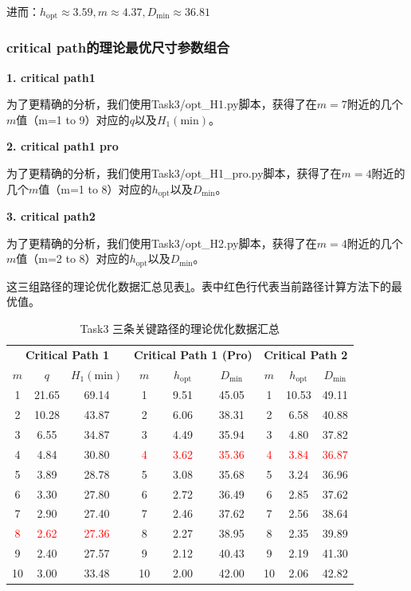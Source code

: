 \documentclass[UTF8,12pt,a4paper]{ctexart}
\begin{document}
进而：$h_{\text{opt}} \approx 3.59, m \approx 4.37, D_{\text{min}} \approx 36.81$


\subsubsection{critical path的理论最优尺寸参数组合}

\textbf{1. critical path1}

为了更精确的分析，我们使用Task3/opt\_H1.py脚本，获得了在$m=7$附近的几个$m$值（m=1 to 9）对应的$q$以及$H_1(\text{min})$。

\textbf{2. critical path1 pro}

为了更精确的分析，我们使用Task3/opt\_H1\_pro.py脚本，获得了在$m=4$附近的几个$m$值（m=1 to 8）对应的$h_{\text{opt}}$以及$D_{\text{min}}$。

\textbf{3. critical path2}

为了更精确的分析，我们使用Task3/opt\_H2.py脚本，获得了在$m=4$附近的几个$m$值（m=2 to 8）对应的$h_{\text{opt}}$以及$D_{\text{min}}$。

这三组路径的理论优化数据汇总见表\ref{tab:task3_theo_opt_all}。表中红色行代表当前路径计算方法下的最优值。

\begin{table}[htbp]
    \centering
    \caption{Task3 三条关键路径的理论优化数据汇总}
    \label{tab:task3_theo_opt_all}
    \small
    \begin{tabular}{ccc|ccc|ccc}
    \toprule
    \multicolumn{3}{c|}{\textbf{Critical Path 1}} & \multicolumn{3}{c|}{\textbf{Critical Path 1 (Pro)}} & \multicolumn{3}{c}{\textbf{Critical Path 2}} \\
    $m$ & $q$ & $H_{1}(\text{min})$ & $m$ & $h_{\text{opt}}$ & $D_{\text{min}}$ & $m$ & $h_{\text{opt}}$ & $D_{\text{min}}$ \\
    \midrule
    1 & 21.65 & 69.14 & 1 & 9.51 & 45.05 & 1 & 10.53 & 49.11 \\
    2 & 10.28 & 43.87 & 2 & 6.06 & 38.31 & 2 & 6.58 & 40.88 \\
    3 & 6.55 & 34.87 & 3 & 4.49 & 35.94 & 3 & 4.80 & 37.82 \\
    4 & 4.84 & 30.80 & \textcolor{red}{4} & \textcolor{red}{3.62} & \textcolor{red}{35.36} & \textcolor{red}{4} & \textcolor{red}{3.84} & \textcolor{red}{36.87} \\
    5 & 3.89 & 28.78 & 5 & 3.08 & 35.68 & 5 & 3.24 & 36.96 \\
    6 & 3.30 & 27.80 & 6 & 2.72 & 36.49 & 6 & 2.85 & 37.62 \\
    7 & 2.90 & 27.40 & 7 & 2.46 & 37.62 & 7 & 2.56 & 38.64 \\
    \textcolor{red}{8} & \textcolor{red}{2.62} & \textcolor{red}{27.36} & 8 & 2.27 & 38.95 & 8 & 2.35 & 39.89 \\
    9 & 2.40 & 27.57 & 9 & 2.12 & 40.43 & 9 & 2.19 & 41.30 \\
    10 & 3.00 & 33.48 & 10 & 2.00 & 42.00 & 10 & 2.06 & 42.82 \\
    \bottomrule
    \end{tabular}
\end{table}
\end{document}
